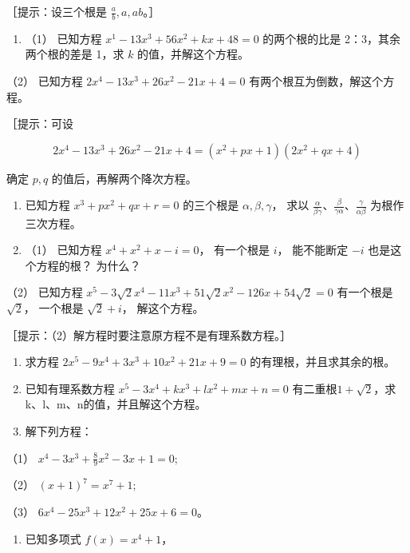 ［提示：设三个根是 \(\frac{a}{b}, a, ab\)。］

\begin{enumerate}[start=11]
\item
  （1） 已知方程 \(x^{1} - 13x^{3} + 56x^{2} + kx + 48 = 0\)
  的两个根的比是 2：3，其余两个根的差是 1，求 \(k\) 的值，并解这个方程。
\end{enumerate}

（2） 已知方程 \(2x^{4} - 13x^{3} + 26x^{2} - 21x + 4 = 0\)
有两个根互为倒数，解这个方程。

［提示：可设

\[
2 x ^ {4} - 13 x ^ {3} + 26 x ^ {2} - 21 x + 4 = (x ^ {2} + p x + 1) (2 x ^ {2} + q x + 4)
\]

确定 \(p, q\) 的值后，再解两个降次方程。

\begin{enumerate}[start=12]
\item
  已知方程 \(x^{3} + px^{2} + qx + r = 0\) 的三个根是
  \(\alpha, \beta, \gamma\)， 求以
  \(\frac{\alpha}{\beta\gamma}\)、\(\frac{\beta}{\gamma\alpha}\)、\(\frac{\gamma}{\alpha\beta}\)
  为根作三次方程。
\item
  （1） 已知方程 \(x^{4} + x^{2} + x - i = 0\)， 有一个根是 \(i\)，
  能不能断定 \(-i\) 也是这个方程的根？ 为什么？
\end{enumerate}

（2） 已知方程
\(x^{5} - 3\sqrt{2} x^{4} - 11x^{3} + 51\sqrt{2} x^{2} - 126x + 54\sqrt{2} = 0\)
有一个根是 \(\sqrt{2}\)， 一个根是 \(\sqrt{2} + i\)， 解这个方程。

［提示：（2）解方程时要注意原方程不是有理系数方程。］

\begin{enumerate}[start=14]
\item
  求方程 \(2x^{5} - 9x^{4} + 3x^{3} + 10x^{2} + 21x + 9 = 0\)
  的有理根，并且求其余的根。
\item
  已知有理系数方程 \(x^{5} - 3x^{4} + kx^{3} + lx^{2} + mx + n = 0\)
  有二重根\(1+\sqrt{2}\)，求k、l、m、n的值，并且解这个方程。
\item
  解下列方程：
\end{enumerate}

（1） \(x^{4} - 3x^{3} + \frac{8}{9} x^{2} - 3x + 1 = 0;\)

（2） \((x + 1)^{7} = x^{7} + 1;\)

（3） \(6x^4-25x^3+12x^2+25x+6=0\)。

\begin{enumerate}[start=17]
\item
  已知多项式 \(f(x) = x^4 + 1\)，
\end{enumerate}

